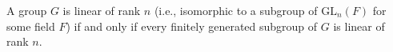 A group $G$ is linear of rank $n$ (i.e., isomorphic to a subgroup of $\text{GL}_n(F)$ for some field $F$) if and only if every finitely generated subgroup of $G$ is linear of rank $n$.

